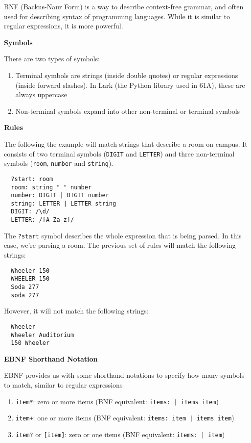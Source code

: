 BNF (Backus-Naur Form) is a way to describe context-free grammar, and often used for describing syntax of programming languages. While it is similar to regular expressions, it is more powerful.

\textbf{Symbols}

There are two types of symbols:
\begin{enumerate}
  \item Terminal symbols are strings (inside double quotes) or regular expressions (inside forward slashes). In Lark (the Python library used in 61A), these are always uppercase
  \item Non-terminal symbols expand into other non-terminal or terminal symbols
\end{enumerate}

\textbf{Rules}

The following the example will match strings that describe a room on campus. It consists of two terminal symbols (\lstinline{DIGIT} and \lstinline{LETTER}) and three non-terminal symbols (\lstinline{room}, \lstinline{number} and \lstinline{string}).
\begin{lstlisting}
  ?start: room
  room: string " " number
  number: DIGIT | DIGIT number
  string: LETTER | LETTER string
  DIGIT: /\d/
  LETTER: /[A-Za-z]/
\end{lstlisting}
The \lstinline{?start} symbol describes the whole expression that is being parsed. In this case, we're parsing a room. The previous set of rules will match the following strings:
\begin{lstlisting}
  Wheeler 150
  WHEELER 150
  Soda 277
  soda 277
\end{lstlisting}
However, it will not match the following strings:
\begin{lstlisting}
  Wheeler
  Wheeler Auditorium
  150 Wheeler
\end{lstlisting}

\textbf{EBNF Shorthand Notation}

EBNF provides us with some shorthand notations to specify how many symbols to match, similar to regular expressions
\begin{enumerate}
  \item \lstinline{item*}: zero or more items (BNF equivalent: \lstinline{items: | items item})
  \item \lstinline{item+}: one or more items (BNF equivalent: \lstinline{items: item | items item})
  \item \lstinline{item?} or \lstinline{[item]}: zero or one items (BNF equivalent: \lstinline{items: | item})
\end{enumerate}

